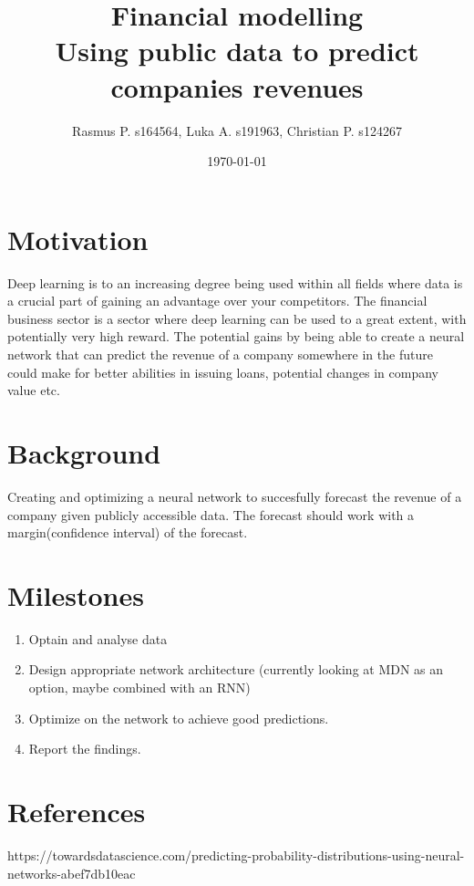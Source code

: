 \documentclass{article}
\title{Financial modelling\\ Using public data to predict companies revenues}
\author{Rasmus P. s164564, Luka A. s191963, Christian P. s124267}
\date{\today}
\begin{document}
\maketitle
\section*{Motivation}
Deep learning is to an increasing degree being used within all fields where data is a crucial part of gaining an advantage over your competitors. The financial business sector is a sector where deep learning can be used to a great extent, with potentially very high reward. 
The potential gains by being able to create a neural network that can predict the revenue of a company somewhere in the future could make for better abilities in issuing loans, potential changes in company value etc.

\section*{Background}
Creating and optimizing a neural network to succesfully forecast the revenue of a company given publicly accessible data. The forecast should work with a margin(confidence interval) of the forecast.

\section*{Milestones}
\begin{enumerate}
	\item Optain and analyse data
	\item Design appropriate network architecture (currently looking at MDN as an option, maybe combined with an RNN)
	\item Optimize on the network to achieve good predictions.
	\item Report the findings.
\end{enumerate}
\section*{References}
https://towardsdatascience.com/predicting-probability-distributions-using-neural-networks-abef7db10eac
\end{document}
